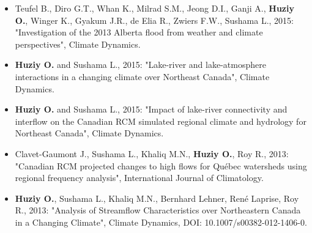 \vspace{\vertspace}


{
\renewcommand{\labelitemi}{}
\begin{itemize}

    \item Teufel B., Diro G.T., Whan K., Milrad S.M., Jeong D.I., Ganji A.,
    \textbf{Huziy O.}, Winger K., Gyakum J.R., de Elia R., Zwiers F.W., Sushama
    L., 2015: "Investigation of the 2013 Alberta flood from weather and climate
    perspectives", Climate Dynamics.

    \item \textbf{Huziy O.} and Sushama L., 2015: "Lake-river and
    lake-atmosphere interactions in a changing climate over Northeast Canada",
    Climate Dynamics.

    \item \textbf{Huziy O.} and Sushama L., 2015: "Impact of lake-river
    connectivity and interflow on the Canadian RCM simulated regional climate
    and hydrology for Northeast Canada", Climate Dynamics.

    \item Clavet-Gaumont J., Sushama L., Khaliq M.N.,
    \textbf{Huziy O.}, Roy R., 2013: "Canadian RCM projected changes to high
    flows for Québec watersheds using regional frequency analysis", International Journal of Climatology.

    \item \textbf{Huziy O.}, Sushama L., Khaliq M.N., Bernhard
    Lehner, René Laprise, Roy R., 2013: "Analysis of Streamflow Characteristics over Northeastern Canada
     in a Changing Climate", Climate Dynamics, DOI:
     10.1007/s00382-012-1406-0.

\end{itemize}
}
